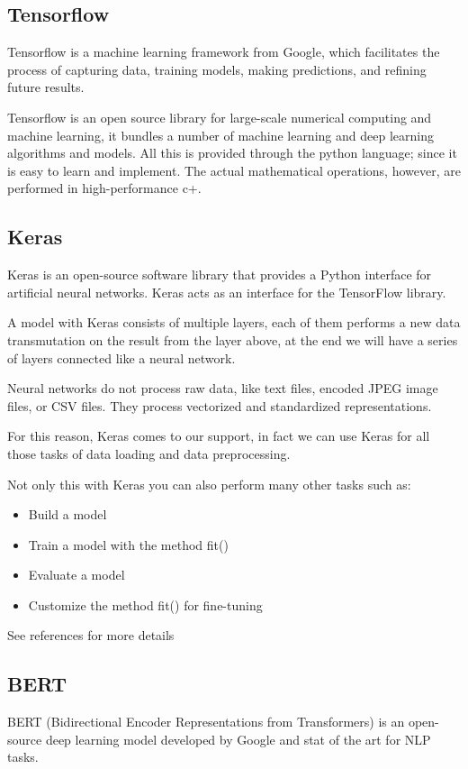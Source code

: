 \subsection{Tensorflow}
Tensorflow \cite{noauthor_tensorflow_nodate} is a machine learning framework from Google, which facilitates the process of capturing data, training models, making predictions, and refining future results.

Tensorflow is an open source library for large-scale numerical computing and machine learning, it bundles a number of machine learning and deep learning algorithms and models.
All this is provided through the python language; since it is easy to learn and implement.
The actual mathematical operations, however, are performed in high-performance c+.

\subsection{Keras}
Keras \cite{noauthor_keras_nodate} is an open-source software library that provides a Python interface for artificial neural networks. Keras acts as an interface for the TensorFlow library.

A model with Keras consists of multiple layers, each of them performs a new data transmutation on the result from the layer above, at the end we will have a series of layers connected like a neural network.

Neural networks do not process raw data, like text files, encoded JPEG image files, or CSV files. They process vectorized and standardized representations.

For this reason, Keras comes to our support, in fact we can use Keras for all those tasks of data loading and data preprocessing.

Not only this with Keras you can also perform many other tasks such as:
\begin{itemize}
    \item Build a model
    \item Train a model with the method fit()
    \item Evaluate a model
    \item Customize the method fit() for fine-tuning
\end{itemize}
See references for more details \cite{team_keras_nodate}

\subsection{BERT}
BERT \cite{devlin_bert_2019} (Bidirectional Encoder Representations from Transformers) is an open-source deep learning model developed by Google and stat of the art for NLP tasks.

